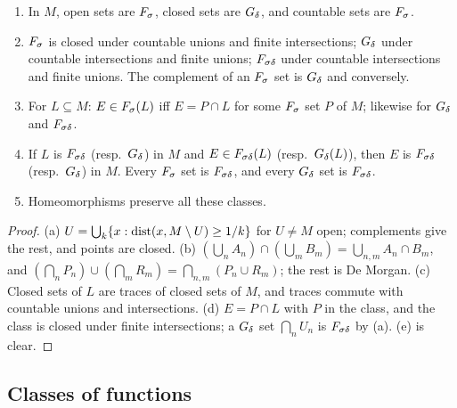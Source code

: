 \begin{lemma}\label{lem:borel-basic}
\begin{enumerate}[label=(\alph*)]
\item In $M$, open sets are $F_\sigma$, closed sets are $G_\delta$, and countable sets are $F_\sigma$.
\item $F_\sigma$ is closed under countable unions and finite intersections; $G_\delta$ under countable
  intersections and finite unions; $F_{\sigma\delta}$ under countable intersections and finite unions. The
  complement of an $F_\sigma$ set is $G_\delta$ and conversely.
\item For $L\subseteq M$: $E\in F_\sigma(L)$ iff $E=P\cap L$ for some $F_\sigma$ set $P$ of $M$; likewise for
  $G_\delta$ and $F_{\sigma\delta}$.
\item If $L$ is $F_{\sigma\delta}$ (resp.\ $G_\delta$) in $M$ and $E\in F_{\sigma\delta}(L)$ (resp.\ $G_\delta(L)$), then $E$ is $F_{\sigma\delta}$
  (resp.\ $G_\delta$) in $M$. Every $F_\sigma$ set is $F_{\sigma\delta}$, and every $G_\delta$ set is $F_{\sigma\delta}$.
\item Homeomorphisms preserve all these classes.
\end{enumerate}
\end{lemma}
\begin{proof}
(a) $U=\bigcup_k\{x:\operatorname{dist}(x,M\setminus U)\ge1/k\}$ for $U\ne M$ open; complements give the rest, and
points are closed. (b) $(\bigcup_nA_n)\cap(\bigcup_mB_m)=\bigcup_{n,m}A_n\cap B_m$, and
$(\bigcap_nP_n)\cup(\bigcap_mR_m)=\bigcap_{n,m}(P_n\cup R_m)$; the rest is De Morgan. (c) Closed sets
of $L$ are traces of closed sets of $M$, and traces commute with countable unions and intersections.
(d) $E=P\cap L$ with $P$ in the class, and the class is closed under finite intersections; a $G_\delta$ set
$\bigcap_nU_n$ is $F_{\sigma\delta}$ by (a). (e) is clear.
\end{proof}

\subsection{Classes of functions}


